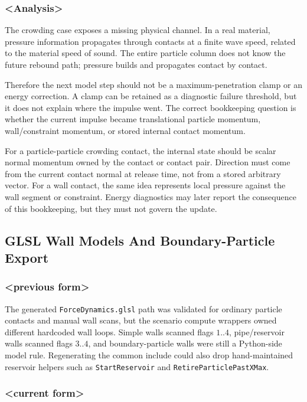 \subsubsection{<Analysis>}

The crowding case exposes a missing physical channel.  In a real material,
pressure information propagates through contacts at a finite wave speed,
related to the material speed of sound.  The entire particle column does not
know the future rebound path; pressure builds and propagates contact by
contact.

Therefore the next model step should not be a maximum-penetration clamp or an
energy correction.  A clamp can be retained as a diagnostic failure threshold,
but it does not explain where the impulse went.  The correct bookkeeping
question is whether the current impulse became translational particle
momentum, wall/constraint momentum, or stored internal contact momentum.

For a particle-particle crowding contact, the internal state should be scalar
normal momentum owned by the contact or contact pair.  Direction must come
from the current contact normal at release time, not from a stored arbitrary
vector.  For a wall contact, the same idea represents local pressure against
the wall segment or constraint.  Energy diagnostics may later report the
consequence of this bookkeeping, but they must not govern the update.

\subsection{GLSL Wall Models And Boundary-Particle Export}

\subsubsection{<previous form>}

The generated \texttt{ForceDynamics.glsl} path was validated for ordinary
particle contacts and manual wall scans, but the scenario compute wrappers
owned different hardcoded wall loops.  Simple walls scanned flags \(1..4\),
pipe/reservoir walls scanned flags \(3..4\), and boundary-particle walls were
still a Python-side model rule.  Regenerating the common include could also
drop hand-maintained reservoir helpers such as \texttt{StartReservoir} and
\texttt{RetireParticlePastXMax}.

\subsubsection{<current form>}

